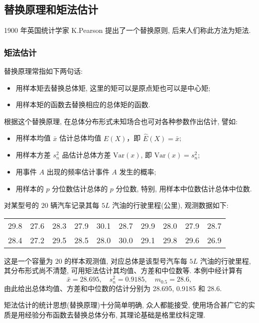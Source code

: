 \subsection{替换原理和矩法估计} %

1900 年英国统计学家 K.Pearson 提出了一个替换原则, 后来人们称此方法为矩法.

\subsubsection{矩法估计}

替换原理常指如下两句话:
\begin{itemize}
\item 用样本矩去替换总体矩, 这里的矩可以是原点矩也可以是中心矩;
\item 用样本矩的函数去替换相应的总体矩的函数.
\end{itemize}

根据这个替换原理, 在总体分布形式未知场合也可对各种参数作出估计, 譬如:
\begin{itemize}
\item 用样本均值 $\bar{x}$ 估计总体均值 $E(X)$，即 $\hat{E}(X)=\bar{x}$;
\item 用样本方差 $s_n^2$ 品估计总体方差 $\mathrm{Var}(x)$, 即 $\mathrm{\hat{V}ar}(x)=s_n^2$;
\item 用事件 $A$ 出现的频率估计事件 $A$ 发生的概率;
\item 用样本的 $p$ 分位数估计总体的 $p$ 分位数, 特别, 用样本中位数估计总体中位数.
\end{itemize}

\begin{example}
对某型号的 $20$ 辆汽车记录其每 $5L$ 汽油的行驶里程(公里), 观测数据如下:

\begin{tabular}{cccccccccc}
29.8 & 27.6 & 28.3 & 27.9 & 30.1 & 28.7 & 29.9 & 28.0 & 27.9 & 28.7\\
28.4 & 27.2 & 29.5 & 28.5 & 28.0 & 30.0 & 29.1 & 29.8 & 29.6 & 26.9		
\end{tabular}

这是一个容量为 $20$ 的样本观测值, 对应总体是该型号汽车每 $5L$ 汽油的行驶里程, 其分布形式尚不清楚, 可用矩法估计其均值、方差和中位数等. 本例中经计算有
\[\bar{x}=28.695,\quad s_n^2=0.9185,\quad m_{0.5}=28.6,\]
由此给出总体均值、方差和中位数的估计分别为 28.695, 0.9185 和 28.6.
\end{example}

矩法估计的统计思想(替换原理)十分简单明确, 众人都能接受, 使用场合甚广它的实质是用经验分布函数去替换总体分布, 其理论基础是格里纹科定理.

